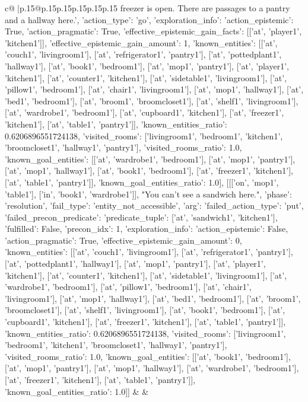 \documentclass{article}
\begin{document}
{\begin{supertabular}{c@{$\;$}|p{.15\linewidth}@{}p{.15\linewidth}p{.15\linewidth}p{.15\linewidth}p{.15\linewidth}p{.15\linewidth}}
{{{freezer is open. There are passages to a pantry and a hallway here.', {'action_type': 'go', 'exploration_info': {'action_epistemic': True, 'action_pragmatic': True, 'effective_epistemic_gain_facts': [['at', 'player1', 'kitchen1']], 'effective_epistemic_gain_amount': 1, 'known_entities': [['at', 'couch1', 'livingroom1'], ['at', 'refrigerator1', 'pantry1'], ['at', 'pottedplant1', 'hallway1'], ['at', 'book1', 'bedroom1'], ['at', 'mop1', 'pantry1'], ['at', 'player1', 'kitchen1'], ['at', 'counter1', 'kitchen1'], ['at', 'sidetable1', 'livingroom1'], ['at', 'pillow1', 'bedroom1'], ['at', 'chair1', 'livingroom1'], ['at', 'mop1', 'hallway1'], ['at', 'bed1', 'bedroom1'], ['at', 'broom1', 'broomcloset1'], ['at', 'shelf1', 'livingroom1'], ['at', 'wardrobe1', 'bedroom1'], ['at', 'cupboard1', 'kitchen1'], ['at', 'freezer1', 'kitchen1'], ['at', 'table1', 'pantry1']], 'known_entities_ratio': 0.6206896551724138, 'visited_rooms': ['livingroom1', 'bedroom1', 'kitchen1', 'broomcloset1', 'hallway1', 'pantry1'], 'visited_rooms_ratio': 1.0, 'known_goal_entities': [['at', 'wardrobe1', 'bedroom1'], ['at', 'mop1', 'pantry1'], ['at', 'mop1', 'hallway1'], ['at', 'book1', 'bedroom1'], ['at', 'freezer1', 'kitchen1'], ['at', 'table1', 'pantry1']], 'known_goal_entities_ratio': 1.0}}], [[['on', 'mop1', 'table1'], ['in', 'book1', 'wardrobe1']], "You can't see a sandwich here.", {'phase': 'resolution', 'fail_type': 'entity_not_accessible', 'arg': {'failed_action_type': 'put', 'failed_precon_predicate': {'predicate_tuple': ['at', 'sandwich1', 'kitchen1'], 'fulfilled': False, 'precon_idx': 1}}, 'exploration_info': {'action_epistemic': False, 'action_pragmatic': True, 'effective_epistemic_gain_amount': 0, 'known_entities': [['at', 'couch1', 'livingroom1'], ['at', 'refrigerator1', 'pantry1'], ['at', 'pottedplant1', 'hallway1'], ['at', 'mop1', 'pantry1'], ['at', 'player1', 'kitchen1'], ['at', 'counter1', 'kitchen1'], ['at', 'sidetable1', 'livingroom1'], ['at', 'wardrobe1', 'bedroom1'], ['at', 'pillow1', 'bedroom1'], ['at', 'chair1', 'livingroom1'], ['at', 'mop1', 'hallway1'], ['at', 'bed1', 'bedroom1'], ['at', 'broom1', 'broomcloset1'], ['at', 'shelf1', 'livingroom1'], ['at', 'book1', 'bedroom1'], ['at', 'cupboard1', 'kitchen1'], ['at', 'freezer1', 'kitchen1'], ['at', 'table1', 'pantry1']], 'known_entities_ratio': 0.6206896551724138, 'visited_rooms': ['livingroom1', 'bedroom1', 'kitchen1', 'broomcloset1', 'hallway1', 'pantry1'], 'visited_rooms_ratio': 1.0, 'known_goal_entities': [['at', 'book1', 'bedroom1'], ['at', 'mop1', 'pantry1'], ['at', 'mop1', 'hallway1'], ['at', 'wardrobe1', 'bedroom1'], ['at', 'freezer1', 'kitchen1'], ['at', 'table1', 'pantry1']], 'known_goal_entities_ratio': 1.0}}]] 
	  } 
	   } 
	   } 
	 & & \\ 
 


\end{supertabular}}
\end{document}

